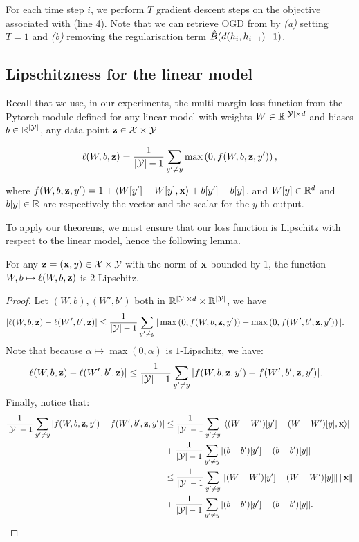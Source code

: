 \begin{noaddcontents}
    For each time step $i$, we perform $T$ gradient descent steps on the objective associated with  (line 4).
    Note that we can retrieve OGD from  by {\it (a)} setting $T=1$ and {\it (b)} removing the regularisation term $\hat{B}(d(h_i, h_{i-1}){-}1)$.
    
    \subsection{Lipschitzness for the linear model}
    \label{sec:lip-linear}
    
    Recall that we use, in our experiments, the multi-margin loss function from the Pytorch module defined for any linear model with weights $W\in\mathbb{R}^{|\mathcal{Y}|\times d}$ and biases $b\in\mathbb{R}^{|\mathcal{Y}|}$, any data point $\mathbf{z}\in \mathcal{X}\times\mathcal{Y}$
    
    \[\ell(W,b,\mathbf{z})= \frac{1}{|\mathcal{Y}|-1}\sum_{y^\prime \neq y} \max\left(0, f(W,b,\mathbf{z},y') \right), \]
    
    where $f(W,b,\mathbf{z},y')= 1+ \langle W[y']-W[y],\mathbf{x} \rangle+b[y']-b[y]$, and $W[y]\in \mathbb{R}^{d}$ and $b[y]\in\mathbb{R}$ are respectively the vector and the scalar for the $y$-th output.
    
    To apply our theorems, we must ensure that our loss function is Lipschitz with respect to the linear model, hence the following lemma.
    
    \begin{lemma}\label{lemma:lipschitz-linear}
        For any $\mathbf{z}=(\mathbf{x},y)\in\mathcal{X}\times\mathcal{Y}$ with the norm of $\mathbf{x}$ bounded by $1$, the function $W,b\mapsto \ell(W,b,\mathbf{z})$ is $2$-Lipschitz.
    \end{lemma}
    
    \begin{proof}
        Let $(W,b),(W',b')$ both in $ \mathbb{R}^{|\mathcal{Y}|\times d}\times \mathbb{R}^{|\mathcal{Y}|}$, we have
        \begin{align*}
            |\ell(W,b,\mathbf{z})- \ell(W',b',\mathbf{z})| & \leq \frac{1}{|\mathcal{Y}|-1}\sum_{y^\prime \neq y} |\max\left(0, f(W,b,\mathbf{z},y') \right) - \max\left(0, f(W',b',\mathbf{z},y') \right)|.
        \end{align*}
        Note that because $\alpha\mapsto\max(0,\alpha)$ is $1$-Lipschitz, we have: 
        \begin{align*}
            |\ell(W,b,\mathbf{z})- \ell(W',b',\mathbf{z})| & \leq \frac{1}{|\mathcal{Y}|-1}\sum_{y^\prime \neq y} | f(W,b,\mathbf{z},y') - f(W',b',\mathbf{z},y')|.
        \end{align*}
        Finally, notice that: 
        \begin{align*}
            \frac{1}{|\mathcal{Y}|-1}\sum_{y^\prime \neq y} | f(W,b,\mathbf{z},y')  -f(W',b',\mathbf{z},y')| &\le \frac{1}{|\mathcal{Y}|-1}\sum_{y^\prime \neq y} \left|\left\langle (W-W')[y'] - (W-W')[y],\mathbf{x}\right\rangle   \right| \\
            & + \frac{1}{|\mathcal{Y}|-1}\sum_{y^\prime \neq y} |(b-b')[y'] - (b-b')[y]|\\
            & \leq \frac{1}{|\mathcal{Y}|-1}\sum_{y^\prime \neq y} \left\| (W-W')[y'] - (W-W')[y]  \right\|\|\mathbf{x}\| \\
            & + \frac{1}{|\mathcal{Y}|-1}\sum_{y^\prime \neq y} |(b-b')[y'] - (b-b')[y]|.
        \end{align*}
    

\end{proof}
\end{noaddcontents}
